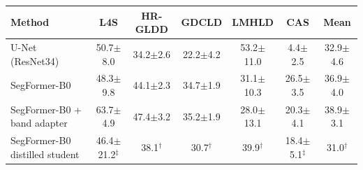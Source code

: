 \begin{tabular}{lcccccc}
\toprule
Method & L4S & HR-GLDD & GDCLD & LMHLD & CAS & Mean \\
\midrule
U-Net (ResNet34) & 50.7$\pm$8.0 & 34.2$\pm$2.6 & 22.2$\pm$4.2 & 53.2$\pm$11.0 & 4.4$\pm$2.5 & 32.9$\pm$4.6 \\
SegFormer-B0 & 48.3$\pm$9.8 & 44.1$\pm$2.3 & 34.7$\pm$1.9 & 31.1$\pm$10.3 & 26.5$\pm$3.5 & 36.9$\pm$4.0 \\
SegFormer-B0 + band adapter & 63.7$\pm$4.9 & 47.4$\pm$3.2 & 35.2$\pm$1.9 & 28.0$\pm$13.1 & 20.3$\pm$4.1 & 38.9$\pm$3.1 \\
SegFormer-B0 distilled student & 46.4$\pm$21.2$^\ddagger$ & 38.1$^\dagger$ & 30.7$^\dagger$ & 39.9$^\dagger$ & 18.4$\pm$5.1$^\ddagger$ & 31.0$^\dagger$ \\
\bottomrule
\end{tabular}
